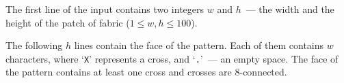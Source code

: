 The first line of the input contains two integers $w$ and $h$~--- the width and the height of the patch of fabric ($1 \le w, h \le 100$).

The following $h$ lines contain the face of the pattern. Each of them contains $w$ characters, where `\texttt{X}' represents a cross, and `\texttt{.}'~--- an empty space. The face of the pattern contains at least one cross and crosses are 8-connected.